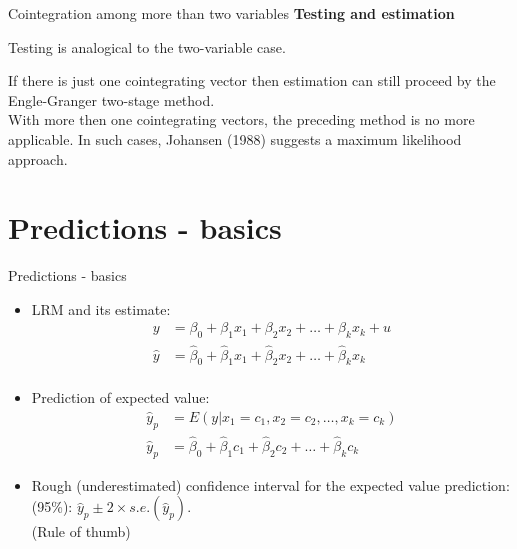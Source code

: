 \documentclass{beamer}
\begin{document}
\begin{frame}{Cointegration among more than two variables}
\textbf{Testing and estimation}\\ \hspace{0.3cm}

Testing is analogical to the two-variable case. \\ \hspace{0.3cm}

If there is just one cointegrating vector then estimation can still proceed by the Engle-Granger two-stage method. \\ 
\vspace{0.3cm}
With more then one cointegrating vectors, the preceding method is no more applicable. In such cases, Johansen (1988) suggests a maximum likelihood approach. 
\end{frame}


\section{Predictions - basics}

\begin{frame}{Predictions - basics}
\begin{itemize}
\item LRM and its estimate:
\begin{align}\nonumber
y & = \beta_0 + \beta_1 x_1 +\beta_2 x_2 + \dots + \beta_k x_k + u\\ \nonumber
\hat{y} & = \hat{\beta}_0 + \hat{\beta}_1 x_1 +\hat{\beta}_2 x_2 + \dots + \hat{\beta}_k x_k \\ \nonumber
\end{align}
\item Prediction of expected value: 
\begin{align}\nonumber
\hat{y}_p & = E(y|x_1 = c_1, x_2 = c_2,\dots,x_k = c_k)\\ \nonumber
\hat{y}_p & = \hat{\beta}_0 + \hat{\beta}_1 c_1 +\hat{\beta}_2 c_2 + \dots + \hat{\beta}_k c_k  \nonumber
\end{align}
\item Rough (underestimated) confidence interval for the expected value prediction: (95\%): $\hat{y}_p \pm 2 \times \textit{s.e.}(\hat{y}_p)$. \\ (Rule of thumb) 
\end{itemize}
\end{frame}
\end{document}
